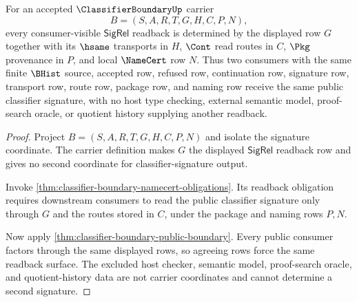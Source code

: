 \begin{theorem}
\label{thm:classifier-boundary-sigrel-consumer-determinacy}
For an accepted $\ClassifierBoundaryUp$ carrier
$$
B=(S,A,R,T,G,H,C,P,N),
$$
every consumer-visible $\mathsf{SigRel}$ readback is determined by the displayed row $G$ together with its $\hsame$ transports in $H$, $\Cont$ read routes in $C$, $\Pkg$ provenance in $P$, and local $\NameCert$ row $N$. Thus two consumers with the same finite $\BHist$ source, accepted row, refused row, continuation row, signature row, transport row, route row, package row, and naming row receive the same public classifier signature, with no host type checking, external semantic model, proof-search oracle, or quotient history supplying another readback.
\end{theorem}
\begin{proof}
Project $B=(S,A,R,T,G,H,C,P,N)$ and isolate the signature coordinate. The carrier definition makes $G$ the displayed $\mathsf{SigRel}$ readback row and gives no second coordinate for classifier-signature output.

Invoke \autoref{thm:classifier-boundary-namecert-obligations}. Its readback obligation requires downstream consumers to read the public classifier signature only through $G$ and the routes stored in $C$, under the package and naming rows $P,N$.

Now apply \autoref{thm:classifier-boundary-public-boundary}. Every public consumer factors through the same displayed rows, so agreeing rows force the same readback surface. The excluded host checker, semantic model, proof-search oracle, and quotient-history data are not carrier coordinates and cannot determine a second signature.
\end{proof}

